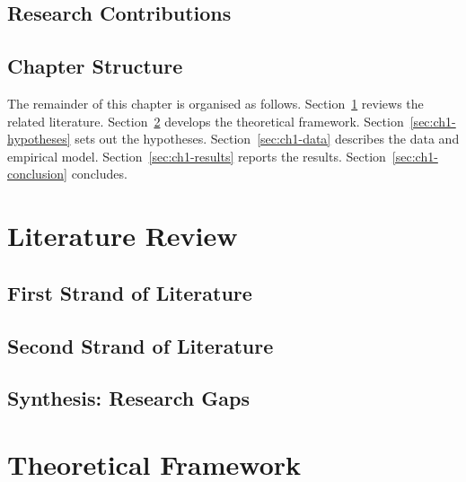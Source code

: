 \documentclass[../main.tex]{subfiles}
\begin{document}
\subsection{Research Contributions}
\lipsum[4]

\subsection{Chapter Structure}
The remainder of this chapter is organised as follows.
Section~\ref{sec:ch1-literature} reviews the related literature.
Section~\ref{sec:ch1-theory} develops the theoretical framework.
Section~\ref{sec:ch1-hypotheses} sets out the hypotheses.
Section~\ref{sec:ch1-data} describes the data and empirical model.
Section~\ref{sec:ch1-results} reports the results.
Section~\ref{sec:ch1-conclusion} concludes.

\section{Literature Review}\label{sec:ch1-literature}


\subsection{First Strand of Literature}
\lipsum[5]

\subsection{Second Strand of Literature}
\lipsum[6]

\subsection{Synthesis: Research Gaps}
\lipsum[7]

\section{Theoretical Framework}\label{sec:ch1-theory}
\end{document}
